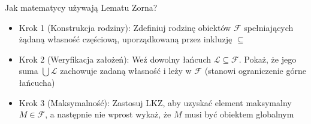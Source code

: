 \documentclass[aspectratio=169,11pt,t,envcountsect,professionalfonts]{beamer}
\begin{document}
\begin{frame}{Jak matematycy używają Lematu Zorna?}

    \begin{itemize}
        \item Krok 1 (Konstrukcja rodziny): Zdefiniuj rodzinę obiektów $\mathcal{F}$ spełniających żądaną własność częściową, uporządkowaną przez inkluzję $\subseteq$
        \item Krok 2 (Weryfikacja założeń): Weź dowolny łańcuch $\mathcal{L} \subseteq \mathcal{F}$. Pokaż, że jego suma $\bigcup \mathcal{L}$ zachowuje zadaną własność i leży w $\mathcal{F}$ (stanowi ograniczenie górne łańcucha)
        \item Krok 3 (Maksymalność): Zastosuj LKZ, aby uzyskać element maksymalny $M \in \mathcal{F}$, a następnie nie wprost wykaż, że $M$ musi być obiektem globalnym
    \end{itemize}
\end{frame}
\end{document}
